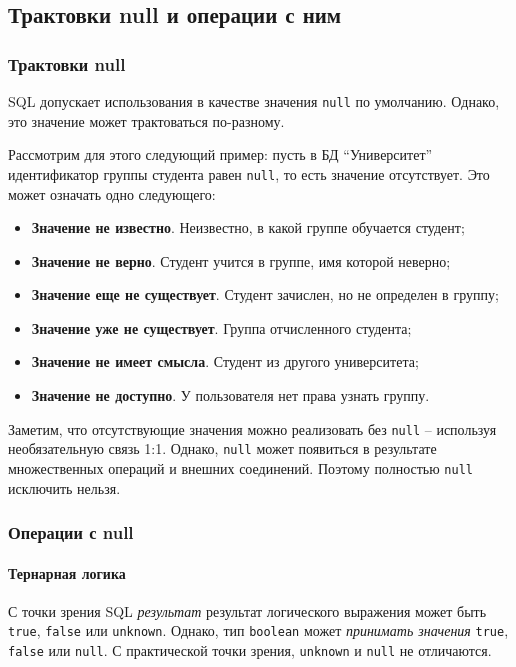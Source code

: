 \subsection{Трактовки null и операции с ним}

\subsubsection{Трактовки null}

SQL допускает использования в качестве значения \texttt{null} по умолчанию. Однако, это
значение может трактоваться по-разному.

Рассмотрим для этого следующий пример: пусть в БД ``Университет'' идентификатор группы студента
равен \texttt{null}, то есть значение отсутствует. Это может означать одно следующего:

\begin{itemize}
	\item \textbf{Значение не известно}. Неизвестно, в какой группе обучается студент;
	\item \textbf{Значение не верно}. Студент учится в группе, имя которой неверно;
	\item \textbf{Значение еще не существует}. Студент зачислен, но не определен в группу;
	\item \textbf{Значение уже не существует}. Группа отчисленного студента;
	\item \textbf{Значение не имеет смысла}. Студент из другого университета;
	\item \textbf{Значение не доступно}. У пользователя нет права узнать группу.
\end{itemize}

Заметим, что отсутствующие значения можно реализовать без \texttt{null} -- используя
необязательную связь 1:1. Однако, \texttt{null} может появиться в результате
множественных операций и внешних соединений. Поэтому полностью \texttt{null} исключить
нельзя.

\subsubsection{Операции с null}

\paragraph{Тернарная логика}

С точки зрения SQL \textit{результат} результат логического выражения может быть
\texttt{true}, \texttt{false} или \texttt{unknown}. Однако, тип
\texttt{boolean} может \textit{принимать значения} \texttt{true},
\texttt{false} или \texttt{null}. С практической точки зрения,
\texttt{unknown} и \texttt{null} не отличаются.

